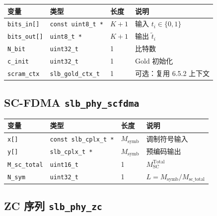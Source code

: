 \documentclass[11pt,a4paper]{ctexart}
\begin{document}
\begin{table}[h]
\centering
\small
\begin{tabular}{llll}
\toprule
\textbf{变量} & \textbf{类型} & \textbf{长度} & \textbf{说明} \\
\midrule
\texttt{bits\_in[]} & \texttt{const uint8\_t *} & $K{+}1$ & 输入 $t_i\in\{0,1\}$ \\
\texttt{bits\_out[]} & \texttt{uint8\_t *} & $K{+}1$ & 输出 $\tilde{t}_i$ \\
\texttt{N\_bit} & \texttt{uint32\_t} & 1 & 比特数 \\
\texttt{c\_init} & \texttt{uint32\_t} & 1 & Gold 初始化 \\
\texttt{scram\_ctx} & \texttt{slb\_gold\_ctx\_t} & 1 & 可选：复用 6.5.2 上下文 \\
\bottomrule
\end{tabular}
\end{table}

\subsection{SC-FDMA \texttt{slb\_phy\_scfdma}}

\begin{table}[h]
\centering
\small
\begin{tabular}{llll}
\toprule
\textbf{变量} & \textbf{类型} & \textbf{长度} & \textbf{说明} \\
\midrule
\texttt{x[]} & \texttt{const slb\_cplx\_t *} & $M_{\mathrm{symb}}$ & 调制符号输入 \\
\texttt{y[]} & \texttt{slb\_cplx\_t *} & $M_{\mathrm{symb}}$ & 预编码输出 \\
\texttt{M\_sc\_total} & \texttt{uint16\_t} & 1 & $M_{\mathrm{SC}}^{\mathrm{Total}}$ \\
\texttt{N\_sym} & \texttt{uint32\_t} & 1 & $L=M_{\mathrm{symb}}/M_{\mathrm{sc\_total}}$ \\
\bottomrule
\end{tabular}
\end{table}

\subsection{ZC 序列 \texttt{slb\_phy\_zc}}
\end{document}
